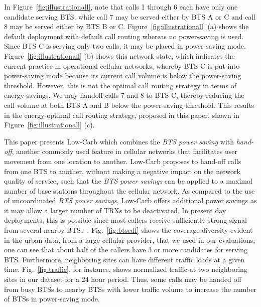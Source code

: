 In Figure~\ref{fig:illustrationall}, note that calls 1 through 6 each have only one candidate serving BTS, while call 7 may be served either by BTS A or C and call 8 may be served either by BTS B or C. Figure~\ref{fig:illustrationall} (a) shows the default deployment with default call routing whereas no power-saving is used. Since BTS C is serving only two calls, it may be placed in power-saving mode. Figure~\ref{fig:illustrationall} (b) shows this network state, which indicates the current practice in operational cellular networks, whereby BTS C is put into power-saving mode because its current call volume is below the power-saving threshold. However, this is not the optimal call routing strategy in terms of energy-savings. We may handoff calls 7 and 8 to BTS C, thereby reducing the call volume at both BTS A and B below the power-saving threshold. This results in the energy-optimal call routing strategy, proposed in this paper, shown in Figure~\ref{fig:illustrationall} (c). 


This paper presents Low-Carb which combines the \textit{BTS
power saving} with \textit{hand-off}, another commonly used
feature in cellular networks that facilitates user movement
from one location to another. Low-Carb proposes to hand-off
calls from one BTS to another, without making a negative impact
on the network quality of service, such that the \textit{BTS
power savings} can be applied to a maximal number of base
stations throughout the cellular network. As compared to the
use of uncoordinated \textit{BTS power savings}, Low-Carb
offers additional power savings as it may allow a larger number
of TRXs to be deactivated. 
In present day deployments, this is possible since most callers
receive sufficiently strong signal from several nearby
BTSs~\cite{Peng:2011:BTSSaving:Mobicom}. Fig.~\ref{fig:btscdf}
shows the coverage diversity evident in the urban data, from a large
cellular provider, that we used in our evaluations; one can see
that about half of the callers have 3 or more candidates for
serving BTS. Furthermore, neighboring sites can have different traffic loads at a given time. Fig.~\ref{fig:traffic}, for instance, shows normalized traffic at two neighboring sites in our dataset for a 24 hour period. Thus, some calls may be handed off from busy BTSs to nearby BTSs with lower traffic volume to increase the number of BTSs in power-saving mode.

